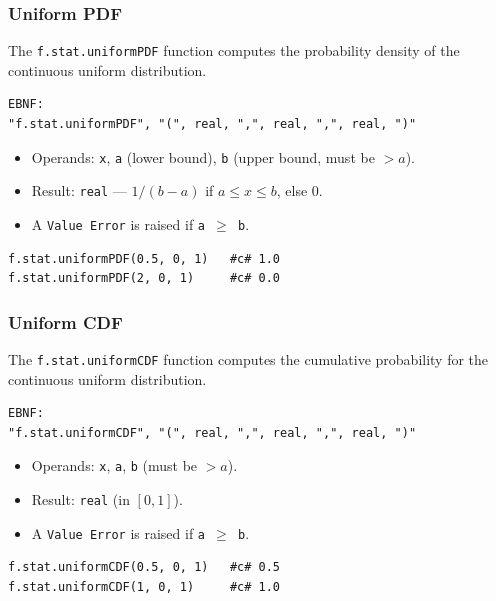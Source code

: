 \subsubsection{Uniform PDF}
The \texttt{f.stat.uniformPDF} function computes the probability density of the continuous uniform distribution.
\begin{verbatim}
EBNF:
"f.stat.uniformPDF", "(", real, ",", real, ",", real, ")"
\end{verbatim}
\begin{itemize}
\item Operands: \texttt{x}, \texttt{a} (lower bound), \texttt{b} (upper bound, must be $> a$).
\item Result: \texttt{real} --- $1/(b-a)$ if $a \leq x \leq b$, else 0.
\item A \texttt{Value Error} is raised if \texttt{a $\geq$ b}.
\end{itemize}
\begin{verbatim}
f.stat.uniformPDF(0.5, 0, 1)   #c# 1.0
f.stat.uniformPDF(2, 0, 1)     #c# 0.0
\end{verbatim}

\subsubsection{Uniform CDF}
The \texttt{f.stat.uniformCDF} function computes the cumulative probability for the continuous uniform distribution.
\begin{verbatim}
EBNF:
"f.stat.uniformCDF", "(", real, ",", real, ",", real, ")"
\end{verbatim}
\begin{itemize}
\item Operands: \texttt{x}, \texttt{a}, \texttt{b} (must be $> a$).
\item Result: \texttt{real} (in $[0, 1]$).
\item A \texttt{Value Error} is raised if \texttt{a $\geq$ b}.
\end{itemize}
\begin{verbatim}
f.stat.uniformCDF(0.5, 0, 1)   #c# 0.5
f.stat.uniformCDF(1, 0, 1)     #c# 1.0
\end{verbatim}

